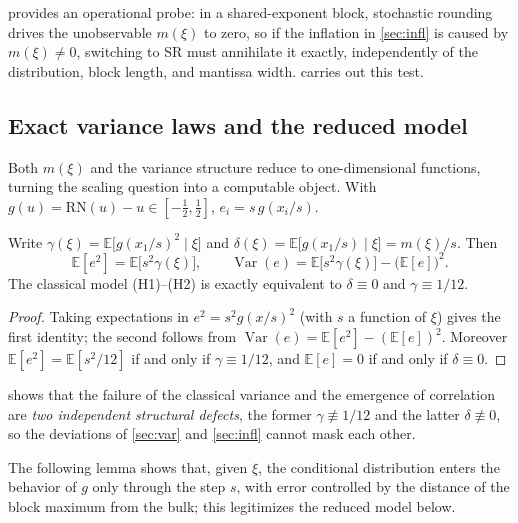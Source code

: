 \documentclass[twocolumn,review,hidelinks,oneeqnum,onetabnum,onefignum,onethmnum]{siamart251216}
\begin{document}
 provides an operational probe: in a shared-exponent block,
stochastic rounding drives the unobservable $m(\xi)$ to zero, so if the
inflation in \cref{sec:infl} is caused by $m(\xi)\ne0$, switching to SR must
annihilate it exactly, independently of the distribution, block length, and
mantissa width.  carries out this test.

\subsection{Exact variance laws and the reduced model}
\label{sec:modeltheory}

Both $m(\xi)$ and the variance structure reduce to one-dimensional functions,
turning the scaling question into a computable object. With
$g(u)=\mathrm{RN}(u)-u\in[-\tfrac12,\tfrac12]$, $e_i=s\,g(x_i/s)$.

\begin{proposition}
\label{prop:var}
Write $\gamma(\xi)=\mathbb{E}\bigl[g(x_1/s)^2\mid\xi\bigr]$ and
$\delta(\xi)=\mathbb{E}\bigl[g(x_1/s)\mid\xi\bigr]=m(\xi)/s$. Then
\begin{equation}
\mathbb{E}[e^2]=\mathbb{E}\bigl[s^2\gamma(\xi)\bigr],
\qquad
\operatorname{Var}(e)=\mathbb{E}\bigl[s^2\gamma(\xi)\bigr]-\bigl(\mathbb{E}[e]\bigr)^2 .
\label{eq:vardecomp}
\end{equation}
The classical model (H1)--(H2) is exactly equivalent to $\delta\equiv0$ and
$\gamma\equiv1/12$.
\end{proposition}

\begin{proof}
Taking expectations in $e^2=s^2g(x/s)^2$ (with $s$ a function of $\xi$) gives
the first identity; the second follows from
$\operatorname{Var}(e)=\mathbb{E}[e^2]-(\mathbb{E}[e])^2$. Moreover
$\mathbb{E}[e^2]=\mathbb{E}[s^2/12]$ if and only if $\gamma\equiv1/12$, and
$\mathbb{E}[e]=0$ if and only if $\delta\equiv0$.
\end{proof}

 shows that the failure of the classical variance and the
emergence of correlation are \emph{two independent structural defects}, the
former $\gamma\not\equiv1/12$ and the latter $\delta\not\equiv0$, so the
deviations of \cref{sec:var} and \cref{sec:infl} cannot mask each other.

The following lemma shows that, given $\xi$, the conditional distribution enters
the behavior of $g$ only through the step $s$, with error controlled by the
distance of the block maximum from the bulk; this legitimizes the reduced model
below.
\end{document}
